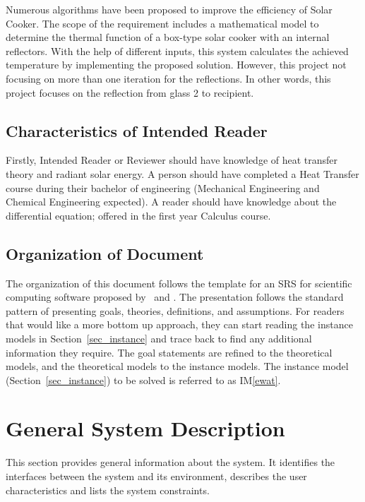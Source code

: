 \documentclass[12pt]{article}
\newcommand{\iref}[1]{IM\ref{#1}}
\begin{document}
Numerous algorithms have been proposed to improve the efficiency of Solar Cooker. The scope of the requirement includes a mathematical model to determine the thermal function of a box-type solar cooker with an internal reflectors. With the help of different inputs, this system calculates the achieved temperature by implementing the proposed solution. However, this project not focusing on more than one iteration for the reflections. In other words, this project focuses on the reflection from glass 2 to recipient.   

\subsection{Characteristics of Intended Reader} \label{sec_IntendedReader}

Firstly, Intended Reader or Reviewer should have knowledge of heat transfer theory and radiant solar energy. A person should have completed a Heat Transfer course during their bachelor of engineering (Mechanical Engineering and Chemical Engineering expected). A reader should have knowledge about the differential equation; offered in the first year Calculus course.        

\subsection{Organization of Document}

The organization of this document follows the template for an SRS for scientific 
computing software proposed by~\cite{Koothoor2013} and \cite{SmithAndLai2005}.
The presentation follows the standard pattern of presenting goals, theories, definitions, 
and assumptions. For readers that would like a more bottom up approach, they can start 
reading the instance models in Section~\ref{sec_instance} and trace back to find any 
additional information they require. The goal statements are refined to the theoretical models, 
and the theoretical models to the instance models. The instance model 
(Section~\ref{sec_instance}) to be solved is referred to as \iref{ewat}.

\section{General System Description}

This section provides general information about the system.  It identifies the
interfaces between the system and its environment, describes the user
characteristics and lists the system constraints.  
\end{document}

